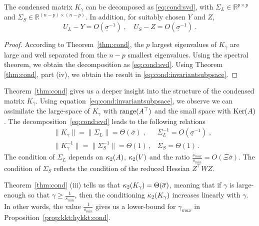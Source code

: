 \begin{corollary}
  The condensed matrix $K_\gamma$ can be decomposed as
  \eqref{eq:cond:svd}, with $\Sigma_L \in \mathbb{R}^{p \times p}$ and $\Sigma_S \in \mathbb{R}^{(n-p) \times (n-p)}$.
  In addition, for suitably chosen $Y$ and $Z$,
  \begin{equation}
    \label{eq:cond:invariantsubpsace}
    U_L - Y = O(\underline{\sigma}^{-1}) \; , \quad
    U_S - Z = O(\underline{\sigma}^{-1}) \; .
  \end{equation}
\end{corollary}
\begin{proof}
  According to Theorem~\ref{thm:cond}, the $p$ largest eigenvalues of $K_\gamma$ are large
  and well separated from the $n - p$ smallest eigenvalues. Using
  the spectral theorem, we obtain the decomposition as \eqref{eq:cond:svd}.
  Using Theorem \ref{thm:cond}, part (iv), we obtain the result
  in \eqref{eq:cond:invariantsubpsace}.
\end{proof}
Theorem~\ref{thm:cond} gives us a deeper insight into the structure
of the condensed matrix $K_\gamma$.
Using equation~\eqref{eq:cond:invariantsubpsace}, we observe
we can assimilate the large-space of $K_\gamma$ with $\operatorname{range}(A^\top)$
and the small space with $\operatorname{Ker}(A)$.
The decomposition~\eqref{eq:cond:svd} leads to the following relations
\begin{equation}
  \label{eq:cond:boundinvariantsubspace}
  \begin{aligned}
    & \| K_\gamma \| = \| \Sigma_L \| = \Theta(\overline{\sigma}) \; , &
    \Sigma_L^{-1} = O(\underline{\sigma}^{-1})  \;, \\
    & \| K_\gamma^{-1} \| = \| \Sigma_S^{-1} \| = \Theta(1) \, , &
  \Sigma_S = \Theta(1) \, .
  \end{aligned}
\end{equation}
The condition of $\Sigma_L$ depends on $\kappa_2(A)$, $\kappa_2(V)$
and the ratio $\frac{s_{max}}{s_{min}} = O(\Xi \overline{\sigma})$.
The condition of $\Sigma_S$ reflects the condition of the reduced Hessian $Z^\top W Z$.

\begin{remark}
  Theorem~\ref{thm:cond} (iii) tells us that $\kappa_2(K_\gamma) = \Theta(\overline{\sigma})$,
  meaning that if $\gamma$ is large-enough so that $\gamma \geq \frac{1}{s_{min}}$, then
  the conditioning $\kappa_2(K_\gamma)$ increases linearly with $\gamma$. In
  other words, the value $\frac{1}{s_{min}}$ gives us a lower-bound for $\gamma_{max}$
  in Proposition~\ref{prop:kkt:hykkt:cond}.
\end{remark}

